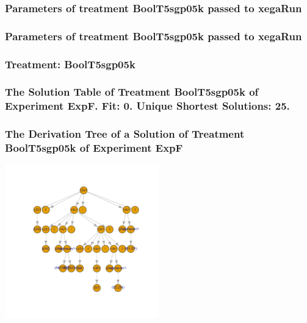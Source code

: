 \documentclass[18pt,c]{beamer}
\begin{document}

 \begin{frame}
 \fontsize{8pt}{9pt}\selectfont
 \frametitle{  Parameters of treatment BoolT5sgp05k passed to xegaRun
 }

 \label{ExpFtParmTable014.tex}  
 \end{frame}


 \begin{frame}
 \fontsize{8pt}{9pt}\selectfont
 \frametitle{  Parameters of treatment BoolT5sgp05k passed to xegaRun
 }

 \label{ExpFtParmTable015.tex}  
 \end{frame}

 \begin{frame}
 \fontsize{8pt}{9pt}\selectfont
 \frametitle{ Treatment: BoolT5sgp05k }

 \label{ExpFStatsTable009.tex}  
 \end{frame}

 \begin{frame}
 \fontsize{8pt}{9pt}\selectfont
 \frametitle{ The Solution Table of Treatment BoolT5sgp05k of Experiment ExpF. Fit: 0. Unique Shortest Solutions: 25. }

 \label{ExpFSolutionTable003.tex}  
 \end{frame}

 \begin{frame}
 \frametitle{ The Derivation Tree of a Solution of Treatment BoolT5sgp05k of Experiment ExpF }
 \begin{center}
\includegraphics[width=0.5\textwidth, angle=0]
{ExpFDerivationTreeFigure003.pdf}
 \end{center}
 \label{report/ExpFDerivationTreeFigure003.pdf}  
 \end{frame}
\end{document}
